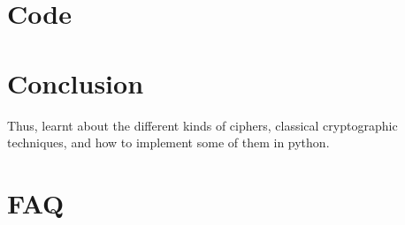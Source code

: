\documentclass[openany]{book}
\begin{document}
\section{Code}


\section{Conclusion}
Thus, learnt about the different kinds of ciphers, classical cryptographic techniques, and how to implement some of them in python.
\clearpage

\section{FAQ}
\end{document}
